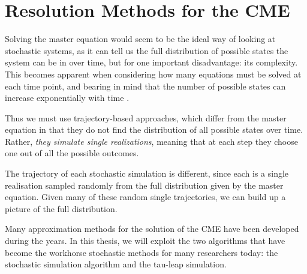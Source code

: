 \documentclass[12pt,a4paper]{report}
\begin{document}
\section{Resolution Methods for the CME}

Solving the master equation would seem to be the ideal way of looking at stochastic systems, as it can tell us the full distribution of possible states the system can be in over time, but for one important disadvantage: its complexity. This becomes apparent when considering how many equations must be solved at each time point, and bearing in mind that the number of possible states can increase exponentially with time \cite{Article}. 
 

Thus we must use trajectory-based approaches, which differ from the master equation in that they do not find the distribution of all possible states over time. Rather, \emph{they simulate single realizations}, meaning that at each step they choose one out of all the possible outcomes.


The trajectory of each stochastic simulation is different, since each is a single realisation sampled randomly from the full distribution given by the master equation. Given many of these random single trajectories, we can build up a picture of the full distribution.


Many approximation methods for the solution of the CME have been developed during the years. In this thesis, we will exploit the two algorithms that have become the workhorse stochastic methods for many researchers today: the stochastic simulation algorithm and the tau-leap simulation.
\end{document}
